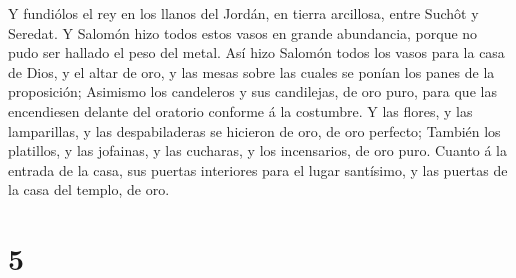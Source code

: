  Y fundiólos el rey en los llanos del Jordán, en tierra
arcillosa, entre Suchôt y Seredat.  Y Salomón hizo todos
estos vasos en grande abundancia, porque no pudo ser hallado el peso del
metal.  Así hizo Salomón todos los vasos para la casa de
Dios, y el altar de oro, y las mesas sobre las cuales se ponían los
panes de la proposición;  Asimismo los candeleros y sus
candilejas, de oro puro, para que las encendiesen delante del oratorio
conforme á la costumbre.  Y las flores, y las
lamparillas, y las despabiladeras se hicieron de oro, de oro perfecto;
 También los platillos, y las jofainas, y las cucharas, y
los incensarios, de oro puro. Cuanto á la entrada de la casa, sus
puertas interiores para el lugar santísimo, y las puertas de la casa del
templo, de oro.

\hypertarget{section-4}{%
\section{5}\label{section-4}}

